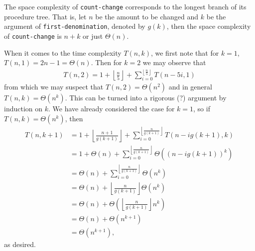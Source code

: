 \documentclass[12pt]{article}
\begin{document}
The space complexity of \verb|count-change| corresponds to the longest branch of its
procedure tree. That is, let $n$ be the amount to be changed and $k$ be the argument of
\verb|first-denomination|, denoted by $g(k)$, then the space complexity of \verb|count-change| is $n+k$ or
just $\Theta(n)$.

\newpage

When it comes to the time complexity $T(n,k)$, we first note that for $k=1$, $T(n,1) = 2n-1 = \Theta(n)$.
Then for $k=2$ we may observe that
\begin{align*}
  T(n,2) = 1 + \left\lfloor\frac{n}{5}\right\rfloor + \sum_{i=0}^{\left\lfloor\frac{n}{5}\right\rfloor}T(n-5i, 1) 
\end{align*}
from which we may suspect that $T(n,2) = \Theta(n^2)$ and in general $T(n,k) = \Theta(n^k)$.
This can be turned into a rigorous (?) argument by induction on $k$. We have already considered the
case for $k=1$, so if $T(n,k) = \Theta(n^k)$, then
\begin{align*}
  T(n,k+1) &= 1 + \left\lfloor\frac{n+1}{g(k+1)}\right\rfloor + \sum_{i=0}^{\left\lfloor\frac{n}{g(k+1)}\right\rfloor}T(n-ig(k+1), k) \\
           &= 1 + \Theta(n) + \sum_{i=0}^{\left\lfloor\frac{n}{g(k+1)}\right\rfloor}\Theta((n-ig(k+1))^k) \\
           &= \Theta(n) + \sum_{i=0}^{\left\lfloor\frac{n}{g(k+1)}\right\rfloor}\Theta(n^k) \\
           &= \Theta(n) + \left\lfloor\frac{n}{g(k+1)}\right\rfloor\Theta(n^k) \\
           &= \Theta(n) + \Theta\left(\left\lfloor\frac{n}{g(k+1)}\right\rfloor n^k\right) \\
           &= \Theta(n) + \Theta(n^{k+1}) \\
           &= \Theta(n^{k+1}),
\end{align*}
as desired.
\end{document}
